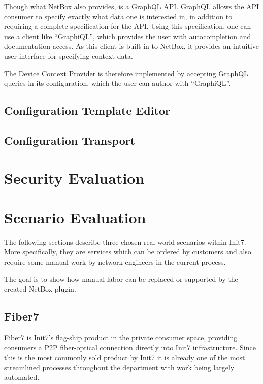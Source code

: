 Though what NetBox also provides, is a GraphQL API. GraphQL allows
the API consumer to specify exactly what data one is interested in,
in addition to requiring a complete specification for the API.
Using this specification, one can use a client like ``GraphiQL'',
which provides the user with autocompletion and documentation
access. As this client is built-in to NetBox, it provides an
intuitive user interface for specifying context data.

The Device Context Provider is therefore implemented by accepting
GraphQL queries in its configuration, which the user can author
with ``GraphiQL''.

\subsection{Configuration Template Editor}

\subsection{Configuration Transport}

\section{\label{eval-security}Security Evaluation}


\section{Scenario Evaluation}

The following sections describe three chosen real-world scenarios within Init7.
More specifically, they are services which can be ordered by customers and also
require some manual work by network engineers in the current process.

The goal is to show how manual labor can be replaced or supported by the
created NetBox plugin.

\subsection{Fiber7}

Fiber7 is Init7's flag-ship product in the private consumer space,
providing consumers a \acrshort{P2P} fiber-optical connection directly into
Init7 infrastructure. Since this is the most commonly sold product by Init7
it is already one of the most streamlined processes throughout the department
with work being largely automated.

